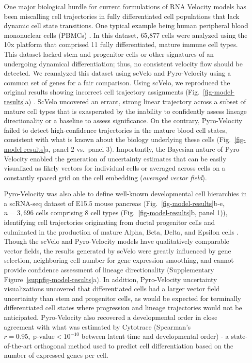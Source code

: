 \documentclass[
  sn-mathphys-num,
  lineno,
  twocolumn]{sn-jnl}
\begin{document}
One major biological hurdle for current formulations of RNA Velocity
models has been miscalling cell trajectories in fully differentiated
cell populations that lack dynamic cell state transitions. One typical
example being human peripheral blood mononuclear cells (PBMCs)
\citep{Zheng2017-bz}. In this dataset, 65,877 cells were analyzed using
the 10x platform that comprised 11 fully differentiated, mature immune
cell types. This dataset lacked stem and progenitor cells or other
signatures of an undergoing dynamical differentiation; thus, no
consistent velocity flow should be detected. We reanalyzed this dataset
using scVelo and Pyro-Velocity using a common set of genes for a fair
comparison. Using scVelo, we reproduced the original results showing
incorrect cell trajectory assignments (Fig.~\ref{fig-model-results}a)
\citep{Bergen2021-qz}. ScVelo uncovered an errant, strong linear
trajectory across a subset of mature cell types \citep{Zheng2017-bz}
that is exasperated by the inability to confidently assess lineage
directionality or a baseline to assess significance. On the contrary,
Pyro-Velocity failed to detect high-confidence trajectories in the
mature blood cell states, consistent with what is known about the
biology underlying these cells (Fig.~\ref{fig-model-results}a, panel 2
vs.~panel 3). Importantly, the Bayesian nature of Pyro-Velocity enabled
the generation of uncertainty estimates that can be easily visualized as
likely vectors for individual cells or averaged across cells on a
constantly spaced grid on the cell embedding (\emph{averaged vector
field}).

Pyro-Velocity was also able to define well-known developmental cell
hierarchies in a scRNA-seq dataset of E15.5 mouse pancreas
(Fig.~\ref{fig-model-results}b-e, \(n=3,696\) cells comprising \(8\)
cell types (Fig.~\ref{fig-model-results}b, panel 1)), identifying cell
trajectories originating from ductal progenitor cells and culminated in
the production of mature Alpha, Beta, Delta, and Epsilon cells
\citep{Bastidas-Ponce2019-lf}. Though the scVelo and Pyro-Velocity
models have qualitatively comparable vector fields, the results
generated by scVelo were greatly influenced by gene selection,
neighboring cell number for gene expression smoothing, and cannot
provide confidence assessment of lineage directionality
(Supplementary Figure~\ref{suppfig-model-results}a). In addition,
Pyro-Velocity uncertainty visualizations uncovered that differentiated
cells had a larger vector field uncertainty than stem and progenitor
cells, as would be expected for terminally differentiated cell states
where progression and lineage trajectories would not be anticipated.
Pyro-Velocity also recovered a developmental order in close agreement
with what was estimated by Cytotrace (Spearman's
\(r=0.95, \; \text{p-value} < 10^{-10}\) between latent time and
developmental order)\citep{Gulati2020-xq} - a state-of-the-art
orthogonal method used to predict cell differentiation based on the
number of expressed genes per cell.
\end{document}
